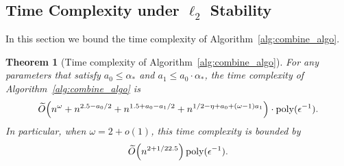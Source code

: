 \documentclass[11pt]{article}
\newtheorem{theorem}{Theorem}[section]
\let\originalleft\left
\let\originalright\right
\renewcommand{\left}{\mathopen{}\mathclose\bgroup\originalleft}
\renewcommand{\right}{\aftergroup\egroup\originalright}
\newcommand{\wt}{\widetilde}
\DeclareMathOperator*{\poly}{{\mathrm{poly}}}
\begin{document}
\subsection{Time Complexity under \texorpdfstring{$\ell_2$}{} Stability}\label{sec:RuntimeL2}
In this section we bound the time complexity of Algorithm~\ref{alg:combine_algo}.
\begin{theorem}[Time complexity of Algorithm~\ref{alg:combine_algo}]\label{thm:time_combine}
For any parameters that satisfy $a_0 \leq \alpha_*$ and $a_1 \leq a_0 \cdot \alpha_*$, the time complexity of Algorithm~\ref{alg:combine_algo} is
\begin{align*}
\wt{O}\left(n^{\omega} + n^{2.5-a_0/2} + n^{1.5+a_0-a_1/2} + n^{1/2-\eta + a_0 + (\omega-1) a_1} \right) \cdot \poly(\epsilon^{-1}).
\end{align*}
In particular, when $\omega = 2 + o(1)$, this time complexity is bounded by
\[
\wt{O}\left(n^{2+1/22.5} \right) \poly(\epsilon^{-1}).
\]
\end{theorem}
\end{document}
